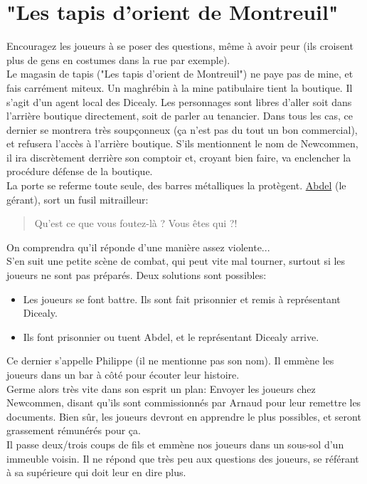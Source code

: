 \documentclass[10pt,a4paper,twocolumn]{article}
\begin{document}
\section{"Les tapis d'orient de Montreuil"}
Encouragez les joueurs à se poser des questions, même à avoir peur (ils croisent plus de gens en costumes dans la rue par exemple). \\
Le magasin de tapis ("Les tapis d'orient de Montreuil") ne paye pas de mine, et fais carrément miteux. Un maghrébin à la mine patibulaire tient la boutique. Il s'agit d'un agent local des Dicealy. Les personnages sont libres d'aller soit dans l'arrière boutique directement, soit de parler au tenancier. Dans tous les cas, ce dernier se montrera très soupçonneux (ça n'est pas du tout un bon commercial), et refusera l'accès à l'arrière boutique. S'ils mentionnent le nom de Newcommen, il ira discrètement derrière son comptoir et, croyant bien faire, va enclencher la procédure défense de la boutique.\\
La porte se referme toute seule, des barres métalliques la protègent. \hyperlink{abdel}{Abdel} (le gérant), sort un fusil mitrailleur:
\begin{quote}
Qu'est ce que vous foutez-là ? Vous êtes qui ?!
\end{quote}
On comprendra qu'il réponde d'une manière assez violente... \\
S'en suit une petite scène de combat, qui peut vite mal tourner, surtout si les joueurs ne sont pas préparés. Deux solutions sont possibles:
\begin{itemize}
	\item Les joueurs se font battre. Ils sont fait prisonnier et remis à représentant Dicealy.
	\item Ils font prisonnier ou tuent Abdel, et le représentant Dicealy arrive.
\end{itemize}
Ce dernier s'appelle Philippe (il ne mentionne pas son nom). Il emmène les joueurs dans un bar à côté pour écouter leur histoire.\\
Germe alors très vite dans son esprit un plan: Envoyer les joueurs chez Newcommen, disant qu'ils sont commissionnés par Arnaud pour leur remettre les documents. Bien sûr, les joueurs devront en apprendre le plus possibles, et seront grassement rémunérés pour ça. \\
Il passe deux/trois coups de fils et emmène nos joueurs dans un sous-sol d'un immeuble voisin. Il ne répond que très peu aux questions des joueurs, se référant à sa supérieure qui doit leur en dire plus.
\end{document}
